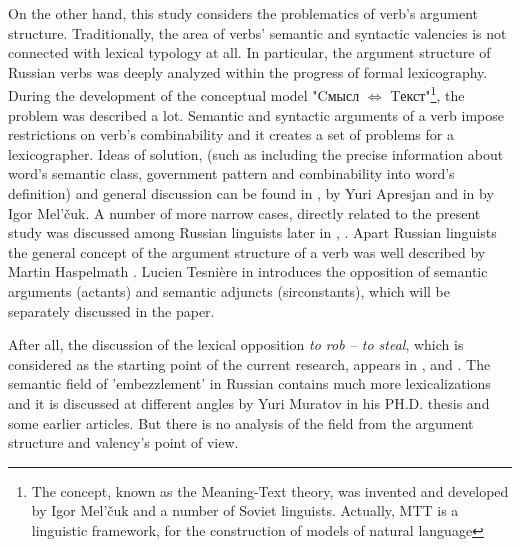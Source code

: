 
On the other hand, this study considers the problematics of verb's argument structure. Traditionally, the area of verbs' semantic and syntactic valencies is not connected with lexical typology at all. In particular, the argument structure of Russian verbs was deeply analyzed  within the progress of formal lexicography. During the development of the conceptual model "Cмысл $\Leftrightarrow$ Tекст"\footnote{The concept, known as the Meaning-Text theory, was invented and developed by Igor Mel'{\v{c}}uk and a number of Soviet linguists. Actually, MTT is a linguistic framework, for the construction of models of natural language}, the problem was described a lot. Semantic and syntactic arguments of a verb impose restrictions on verb's combinability and it creates a set of problems for a lexicographer. Ideas of solution, (such as including the precise information about word's semantic class, government pattern and combinability into word's definition) and general discussion can be found in \citep[119-156]{апресян1995избранные}, \citep[129-131]{апресян1995избранные2} by Yuri Apresjan and in \citep[134–139]{мельчук1974опыт} by Igor Mel’{\v{c}}uk. A number of more narrow cases, directly related to the present study was discussed among Russian linguists later in \citep{муравенко1998случаях}, \citep{цинман1998модель}. Apart Russian linguists the general concept of the argument structure of a verb was well described by Martin Haspelmath  \citep{haspelmath2004valency}. Lucien Tesnière in \citep{tesniere1959elements} introduces the opposition of semantic arguments (actants) and semantic adjuncts (sirconstants), which will be separately discussed in the paper.
 
\par After all, the discussion of the lexical opposition \textit{to rob -- to steal}, which is considered as the starting point of the current research, appears in \citep[45-48]{goldberg1995constructions}, \citep{thorgren2005transaction} and \citep{van2007role}. The semantic field of 'embezzlement' in Russian contains much more lexicalizations and it is discussed at different angles by Yuri Muratov in his PH.D. thesis \citep{муратовгенетическая} and some earlier articles. But there is no analysis of the field from the argument structure and valency's point of view. 

